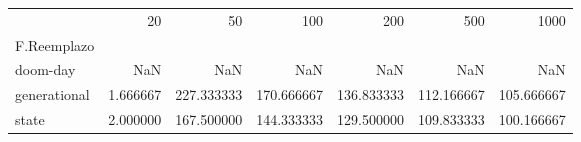 \begin{tabular}{lrrrrrr}
\toprule
{} &      20   &        50   &        100  &        200  &        500  &        1000 \\
F.Reemplazo  &           &             &             &             &             &             \\
\midrule
doom-day     &       NaN &         NaN &         NaN &         NaN &         NaN &         NaN \\
generational &  1.666667 &  227.333333 &  170.666667 &  136.833333 &  112.166667 &  105.666667 \\
state        &  2.000000 &  167.500000 &  144.333333 &  129.500000 &  109.833333 &  100.166667 \\
\bottomrule
\end{tabular}
